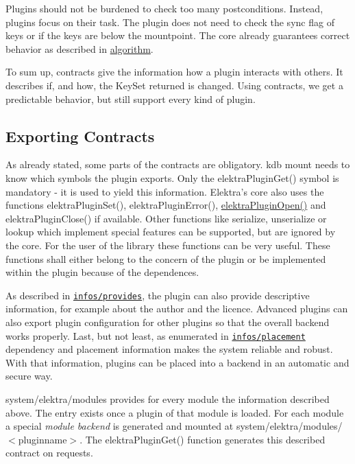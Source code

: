 Plugins should not be burdened to check too many postconditions. Instead, plugins focus on their task. The plugin does not need to check the sync flag of keys or if the keys are below the mountpoint. The core already guarantees correct behavior as described in \hyperlink{doc_dev_algorithm_md}{algorithm}.

To sum up, contracts give the information how a plugin interacts with others. It describes if, and how, the {\ttfamily Key\+Set} {\ttfamily returned} is changed. Using contracts, we get a predictable behavior, but still support every kind of plugin.

\subsection*{Exporting Contracts}

As already stated, some parts of the contracts are obligatory. {\ttfamily kdb mount} needs to know which symbols the plugin exports. Only the {\ttfamily elektra\+Plugin\+Get()} symbol is mandatory -\/ it is used to yield this information. Elektra’s core also uses the functions {\ttfamily elektra\+Plugin\+Set()}, {\ttfamily elektra\+Plugin\+Error()}, {\ttfamily \hyperlink{elektra_2plugin_8c_a32a70a7876542c51d153164ac5108a57}{elektra\+Plugin\+Open()}} and {\ttfamily elektra\+Plugin\+Close()} if available. Other functions like {\ttfamily serialize}, {\ttfamily unserialize} or {\ttfamily lookup} which implement special features can be supported, but are ignored by the core. For the user of the library these functions can be very useful. These functions shall either belong to the concern of the plugin or be implemented within the plugin because of the dependences.

As described in \href{/home/markus/Projekte/Elektra/current/doc/CONTRACT.ini}{\tt infos/provides}, the plugin can also provide descriptive information, for example about the author and the licence. Advanced plugins can also export plugin configuration for other plugins so that the overall backend works properly. Last, but not least, as enumerated in \href{/home/markus/Projekte/Elektra/current/doc/CONTRACT.ini}{\tt infos/placement} dependency and placement information makes the system reliable and robust. With that information, plugins can be placed into a backend in an automatic and secure way.

{\ttfamily system/elektra/modules} provides for every module the information described above. The entry exists once a plugin of that module is loaded. For each module a special {\itshape module backend} is generated and mounted at {\ttfamily system/elektra/modules/$<$pluginname$>$}. The {\ttfamily elektra\+Plugin\+Get()} function generates this described contract on requests.

